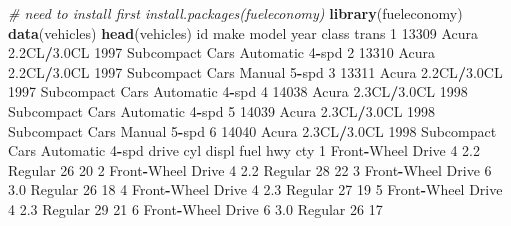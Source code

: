\documentclass[
]{book}
\newenvironment{Shaded}{\begin{snugshade}}{\end{snugshade}}
\newcommand{\CommentTok}[1]{\textcolor[rgb]{0.56,0.35,0.01}{\textit{#1}}}
\newcommand{\DecValTok}[1]{\textcolor[rgb]{0.00,0.00,0.81}{#1}}
\newcommand{\FloatTok}[1]{\textcolor[rgb]{0.00,0.00,0.81}{#1}}
\newcommand{\FunctionTok}[1]{\textcolor[rgb]{0.13,0.29,0.53}{\textbf{#1}}}
\newcommand{\NormalTok}[1]{#1}
\newcommand{\SpecialCharTok}[1]{\textcolor[rgb]{0.81,0.36,0.00}{\textbf{#1}}}
\begin{document}
\begin{Shaded}
\begin{Highlighting}[]
\CommentTok{\# need to install first install.packages(\textquotesingle{}fueleconomy\textquotesingle{})}
\FunctionTok{library}\NormalTok{(fueleconomy)}
\FunctionTok{data}\NormalTok{(vehicles)}
\FunctionTok{head}\NormalTok{(vehicles)}
\NormalTok{     id  make       model year           class           trans}
\DecValTok{1} \DecValTok{13309}\NormalTok{ Acura }\FloatTok{2.2}\NormalTok{CL}\SpecialCharTok{/}\FloatTok{3.0}\NormalTok{CL }\DecValTok{1997}\NormalTok{ Subcompact Cars Automatic }\DecValTok{4}\SpecialCharTok{{-}}\NormalTok{spd}
\DecValTok{2} \DecValTok{13310}\NormalTok{ Acura }\FloatTok{2.2}\NormalTok{CL}\SpecialCharTok{/}\FloatTok{3.0}\NormalTok{CL }\DecValTok{1997}\NormalTok{ Subcompact Cars    Manual }\DecValTok{5}\SpecialCharTok{{-}}\NormalTok{spd}
\DecValTok{3} \DecValTok{13311}\NormalTok{ Acura }\FloatTok{2.2}\NormalTok{CL}\SpecialCharTok{/}\FloatTok{3.0}\NormalTok{CL }\DecValTok{1997}\NormalTok{ Subcompact Cars Automatic }\DecValTok{4}\SpecialCharTok{{-}}\NormalTok{spd}
\DecValTok{4} \DecValTok{14038}\NormalTok{ Acura }\FloatTok{2.3}\NormalTok{CL}\SpecialCharTok{/}\FloatTok{3.0}\NormalTok{CL }\DecValTok{1998}\NormalTok{ Subcompact Cars Automatic }\DecValTok{4}\SpecialCharTok{{-}}\NormalTok{spd}
\DecValTok{5} \DecValTok{14039}\NormalTok{ Acura }\FloatTok{2.3}\NormalTok{CL}\SpecialCharTok{/}\FloatTok{3.0}\NormalTok{CL }\DecValTok{1998}\NormalTok{ Subcompact Cars    Manual }\DecValTok{5}\SpecialCharTok{{-}}\NormalTok{spd}
\DecValTok{6} \DecValTok{14040}\NormalTok{ Acura }\FloatTok{2.3}\NormalTok{CL}\SpecialCharTok{/}\FloatTok{3.0}\NormalTok{CL }\DecValTok{1998}\NormalTok{ Subcompact Cars Automatic }\DecValTok{4}\SpecialCharTok{{-}}\NormalTok{spd}
\NormalTok{              drive cyl displ    fuel hwy cty}
\DecValTok{1}\NormalTok{ Front}\SpecialCharTok{{-}}\NormalTok{Wheel Drive   }\DecValTok{4}   \FloatTok{2.2}\NormalTok{ Regular  }\DecValTok{26}  \DecValTok{20}
\DecValTok{2}\NormalTok{ Front}\SpecialCharTok{{-}}\NormalTok{Wheel Drive   }\DecValTok{4}   \FloatTok{2.2}\NormalTok{ Regular  }\DecValTok{28}  \DecValTok{22}
\DecValTok{3}\NormalTok{ Front}\SpecialCharTok{{-}}\NormalTok{Wheel Drive   }\DecValTok{6}   \FloatTok{3.0}\NormalTok{ Regular  }\DecValTok{26}  \DecValTok{18}
\DecValTok{4}\NormalTok{ Front}\SpecialCharTok{{-}}\NormalTok{Wheel Drive   }\DecValTok{4}   \FloatTok{2.3}\NormalTok{ Regular  }\DecValTok{27}  \DecValTok{19}
\DecValTok{5}\NormalTok{ Front}\SpecialCharTok{{-}}\NormalTok{Wheel Drive   }\DecValTok{4}   \FloatTok{2.3}\NormalTok{ Regular  }\DecValTok{29}  \DecValTok{21}
\DecValTok{6}\NormalTok{ Front}\SpecialCharTok{{-}}\NormalTok{Wheel Drive   }\DecValTok{6}   \FloatTok{3.0}\NormalTok{ Regular  }\DecValTok{26}  \DecValTok{17}
\end{Highlighting}
\end{Shaded}
\end{document}
